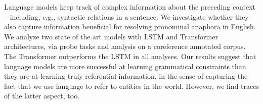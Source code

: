 Language models keep track of complex information about the preceding context -- including, e.g., syntactic relations in a sentence. We investigate whether they also capture information beneficial for resolving pronominal anaphora in English. We analyze two state of the art models with LSTM and Transformer architectures, via probe tasks and analysis on a coreference annotated corpus. The Transformer outperforms the LSTM in all analyses. Our results suggest that language models are more successful at learning grammatical constraints than they are at learning truly referential information, in the sense of capturing the fact that we use language to refer to entities in the world. However, we find traces of the latter aspect, too.
